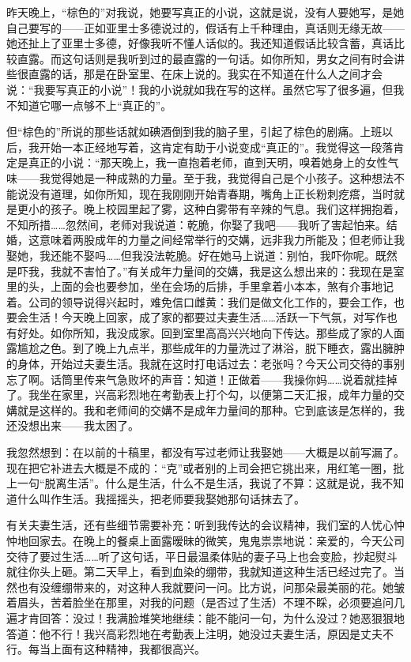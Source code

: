 昨天晚上，“棕色的”对我说，她要写真正的小说，这就是说，没有人要她写，是她自己要写的——正如亚里士多德说过的，假话有上千种理由，真话则无缘无故——她还扯上了亚里士多德，好像我听不懂人话似的。我还知道假话比较含蓄，真话比较直露。而这句话则是我听到过的最直露的一句话。如你所知，男女之间有时会讲些很直露的话，那是在卧室里、在床上说的。我实在不知道在什么人之间才会说：“我要写真正的小说”！我的小说就如我在写的这样。虽然它写了很多遍，但我不知道它哪一点够不上“真正的”。 

但“棕色的”所说的那些话就如碘酒倒到我的脑子里，引起了棕色的剧痛。上班以后，我开始一本正经地写着，这肯定有助于小说变成“真正的”。我觉得这一段落肯定是真正的小说：“那天晚上，我一直抱着老师，直到天明，嗅着她身上的女性气味——我觉得她是一种成熟的力量。至于我，我觉得自己是个小孩子。这种想法不能说没有道理，如你所知，现在我刚刚开始青春期，嘴角上正长粉刺疙瘩，当时就是更小的孩子。晚上校园里起了雾，这种白雾带有辛辣的气息。我们这样拥抱着，不知所措……忽然间，老师对我说道：乾脆，你娶了我吧——我听了害起怕来。结婚，这意味着两股成年的力量之间经常举行的交媾，远非我力所能及；但老师让我娶她，我还能不娶吗……但我没法乾脆。好在她马上说道：别怕，我吓你呢。既然是吓我，我就不害怕了。”有关成年力量间的交媾，我是这么想出来的：我现在是室里的头，上面的会也要参加，坐在会场的后排，手里拿着小本本，煞有介事地记着。公司的领导说得兴起时，难免信口雌黄：我们是做文化工作的，要会工作，也要会生活！今天晚上回家，成了家的都要过夫妻生活……活跃一下气氛，对写作也有好处。如你所知，我没成家。回到室里高高兴兴地向下传达。那些成了家的人面露尴尬之色。到了晚上九点半，那些成年的力量洗过了淋浴，脱下睡衣，露出臃肿的身体，开始过夫妻生活。我就在这时打电话过去：老张吗？今天公司交待的事别忘了啊。话筒里传来气急败坏的声音：知道！正做着——我操你妈……说着就挂掉了。我坐在家里，兴高彩烈地在考勤表上打个勾，以便第二天汇报，成年力量的交媾就是这样的。我和老师间的交媾不是成年力量间的那种。它到底该是怎样的，我还没想出来——我太困了。 

我忽然想到：在以前的十稿里，都没有写过老师让我娶她——大概是以前写漏了。现在把它补进去大概是不成的：“克”或者别的上司会把它挑出来，用红笔一圈，批上一句“脱离生活”。什么是生活，什么不是生活，我说了不算：这就是说，我不知道什么叫作生活。我摇摇头，把老师要我娶她那句话抹去了。 

有关夫妻生活，还有些细节需要补充：听到我传达的会议精神，我们室的人忧心忡忡地回家去。在晚上的餐桌上面露暧昧的微笑，鬼鬼祟祟地说：亲爱的，今天公司交待了要过生活……听了这句话，平日最温柔体贴的妻子马上也会变脸，抄起熨斗就往你头上砸。第二天早上，看到血染的绷带，我就知道这种生活已经过完了。当然也有没缠绷带来的，对这种人我就要问一问。比方说，问那朵最美丽的花。她皱着眉头，苦着脸坐在那里，对我的问题（是否过了生活）不理不睬，必须要追问几遍才肯回答：没过！我满脸堆笑地继续：能不能问一句，为什么没过？她恶狠狠地答道：他不行！我兴高彩烈地在考勤表上注明，她没过夫妻生活，原因是丈夫不行。每当上面有这种精神，我都很高兴。 

